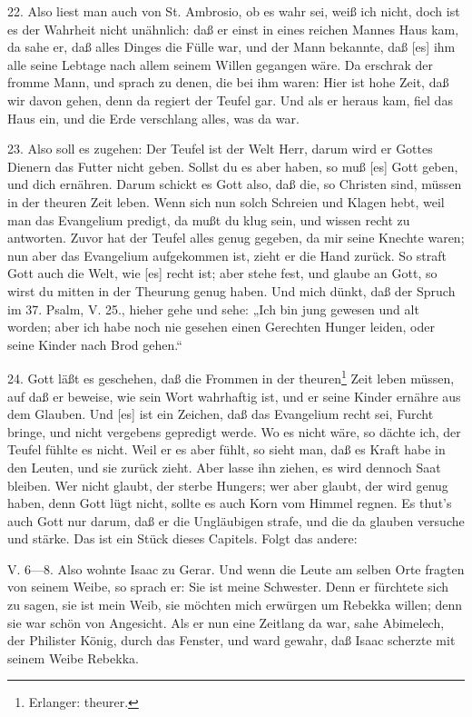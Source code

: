 22. Also liest man auch von St. Ambrosio, ob es wahr sei, weiß ich nicht, doch ist es der Wahrheit nicht unähnlich: daß er einst in eines reichen Mannes Haus kam, da sahe er, daß alles Dinges die Fülle war, und der Mann bekannte, daß [es] ihm alle seine Lebtage nach allem seinem Willen gegangen wäre. Da erschrak der fromme Mann, und sprach zu denen, die bei ihm waren: Hier ist hohe Zeit, daß wir davon gehen, denn da regiert der Teufel gar. Und als er heraus kam, fiel das Haus ein, und die Erde verschlang alles, was da war.

23. Also soll es zugehen: Der Teufel ist der Welt Herr, darum wird er Gottes Dienern das Futter nicht geben. Sollst du es aber haben, so muß [es] Gott geben, und dich ernähren. Darum schickt es Gott also, daß die, so Christen sind, müssen in der theuren Zeit leben. Wenn sich nun solch Schreien und Klagen hebt, weil man das Evangelium predigt, da mußt du klug sein, und wissen recht zu antworten. Zuvor hat der Teufel alles genug gegeben, da mir seine Knechte waren; nun aber das Evangelium aufgekommen ist, zieht er die Hand zurück. So straft Gott auch die Welt, wie [es] recht ist; aber stehe fest, und glaube an Gott, so wirst du mitten in der Theurung genug haben. Und mich dünkt, daß der Spruch im 37. Psalm, V. 25., hieher gehe und sehe: „Ich bin jung gewesen und alt worden; aber ich habe noch nie gesehen einen Gerechten Hunger leiden, oder seine Kinder nach Brod gehen.“

24. Gott läßt es geschehen, daß die Frommen in der theuren\footnote{Erlanger: theurer.} Zeit leben müssen, auf daß er beweise, wie sein Wort wahrhaftig ist, und er seine Kinder ernähre aus dem Glauben. Und [es] ist ein Zeichen, daß das Evangelium recht sei, Furcht bringe, und nicht vergebens gepredigt werde. Wo es nicht wäre, so dächte ich, der Teufel fühlte es nicht. Weil er es aber fühlt, so sieht man, daß es Kraft habe in den Leuten, und sie zurück zieht. Aber lasse ihn ziehen, es wird dennoch Saat bleiben. Wer nicht glaubt, der sterbe Hungers; wer aber glaubt, der wird genug haben, denn Gott lügt nicht, sollte es auch Korn vom Himmel regnen. Es thut’s auch Gott nur darum, daß er die Ungläubigen strafe, und die da glauben versuche und stärke. Das ist ein Stück dieses Capitels. Folgt das andere:

V. 6—8. Also wohnte Isaac zu Gerar. Und wenn die Leute am selben Orte fragten von seinem Weibe, so sprach er: Sie ist meine Schwester. Denn er fürchtete sich zu sagen, sie ist mein Weib, sie möchten mich erwürgen um Rebekka willen; denn sie war schön von Angesicht. Als er nun eine Zeitlang da war, sahe Abimelech, der Philister König, durch das Fenster, und ward gewahr, daß Isaac scherzte mit seinem Weibe Rebekka.

